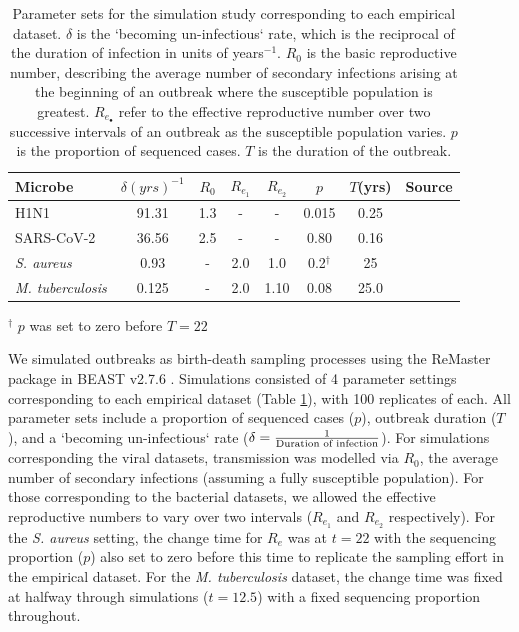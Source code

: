 \documentclass[12pt]{article}
\begin{document}
\begin{spacing}{2}
\begin{table}[H]
    \centering
    \caption{Parameter sets for the simulation study corresponding to each empirical dataset. $\delta$ is the `becoming un-infectious` rate, which is the reciprocal of the duration of infection in units of years$^{-1}$. $R_0$ is the basic reproductive number, describing the average number of secondary infections arising at the beginning of an outbreak where the susceptible population is greatest. $R_{e_\bullet}$ refer to the effective reproductive number over two successive intervals of an outbreak as the susceptible population varies. $p$ is the proportion of sequenced cases. $T$ is the duration of the outbreak.}
    \begin{tabular}{lccccccl}
    \toprule
    Microbe                     &   $\delta (yrs)^{-1}$    & $R_0$ &   $R_{e_1}$   &  $R_{e_2}$    &   $p$   &   $T$(yrs)   & Source \\
    \midrule
    H1N1                        &   91.31    & 1.3 &   -   &  -    &   0.015   &   0.25 & \citet{hedge_2013_real-time} \\
    SARS-CoV-2                  &   36.56    & 2.5 &   -   &  -   &   0.80   &  0.16 & \citet{lane2021genomics} \\
    \textit{S. aureus}    &   0.93    &  - &   2.0   &  1.0   &   0.2$^{\dagger}$   &   25 & \citet{duchene_2016_genome} \\
    \textit{M. tuberculosis}    &   0.125    &  - &   2.0   &  1.10    &   0.08   &   25.0 & \citet{kuhnert_tuberculosis_2018} \\
    \bottomrule
    \end{tabular}
    \label{tab:sim_parms}
\end{table}
\footnotesize
$^\dagger$ $p$ was set to zero before $T=22$
\normalsize

We simulated outbreaks as birth-death sampling processes using the ReMaster package in BEAST v2.7.6 \citep{vaughan_remaster_2024,bouckaert_beast_2019}. Simulations consisted of 4 parameter settings corresponding to each empirical dataset (Table \ref{tab:sim_parms}), with 100 replicates of each. All parameter sets include a proportion of sequenced cases ($p$), outbreak duration ($T$), and a `becoming un-infectious` rate ($\delta = \frac{1}{\textnormal{Duration of infection}}$). For simulations corresponding the viral datasets, transmission was modelled via $R_0$, the average number of secondary infections (assuming a fully susceptible population). For those corresponding to the bacterial datasets, we allowed the effective reproductive numbers to vary over two intervals ($R_{e_1}$ and $R_{e_2}$ respectively). For the \textit{S. aureus} setting, the change time for $R_e$ was at $t=22$ with the sequencing proportion ($p$) also set to zero before this time to replicate the sampling effort in the empirical dataset. For the \textit{M. tuberculosis} dataset, the change time was fixed at halfway through simulations ($t=12.5$) with a fixed sequencing proportion throughout.


\end{spacing}
\end{document}
